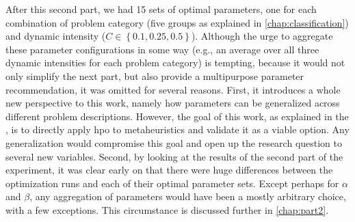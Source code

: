 After this second part, we had 15 sets of optimal parameters, one for each combination of problem category (five groups as explained in \cref{chap:classification}) and dynamic intensity ($C \in \left\lbrace 0.1,0.25,0.5\right\rbrace$). Although the urge to aggregate these parameter configurations in some way (e.g., an average over all three dynamic intensities for each problem category) is tempting, because it would not only simplify the next part, but also provide a multipurpose parameter recommendation, it was omitted for several reasons. First, it introduces a whole new perspective to this work, namely how parameters can be generalized across different problem descriptions. However, the goal of this work, as explained in the , is to directly apply \glsdesc{hpo} to metaheuristics and validate it as a viable option. Any generalization would compromise this goal and open up the research question to several new variables. Second, by looking at the results of the second part of the experiment, it was clear early on that there were huge differences between the optimization runs and each of their optimal parameter sets. Except perhaps for $\alpha$ and $\beta$, any aggregation of parameters would have been a mostly arbitrary choice, with a few exceptions. This circumstance is discussed further in \cref{chap:part2}.

